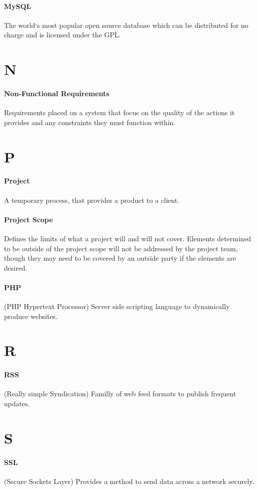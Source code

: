 \documentclass[letterpaper,12pt]{report}
\begin{document}
\paragraph{MySQL} The world`s most popular open source database which can be distributed for no charge and is licensed under the GPL.
\section*{N}
\paragraph{Non-Functional Requirements} Requirements placed on a system that focus on the quality of the actions it provides and any constraints they must function within.
\section*{P}
\paragraph{Project} A temporary process, that provides a product to a client.
\paragraph{Project Scope} Defines the limits of what a project will and will not cover.  Elements determined to be outside of the project scope will not be addressed by the project team, though they may need to be covered by an outside party if the elements are desired.
\paragraph{PHP} (PHP Hypertext Processor) Server side scripting language to dynamically produce websites.
\section*{R}
\paragraph{RSS} (Really simple Syndication) Familly of web feed formats to publish frequent updates.
\section*{S}
\paragraph{SSL} (Secure Sockets Layer) Provides a method to send data across a network securely.
\end{document}
